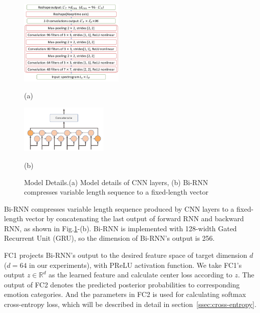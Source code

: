 \documentclass{article}
\begin{document}
\begin{figure}[htb]
	\begin{minipage}[b]{0.04\linewidth}
		\hfill
	\end{minipage}
	\begin{minipage}[b]{0.52\linewidth}
		\centering
		\centerline{\includegraphics[width=5.0cm]{fig2.pdf}}
		\centerline{(a)}\medskip
		
	\end{minipage}
	\hfill
	\begin{minipage}[b]{.42\linewidth}
		\centering
		\centerline{\includegraphics[width=4.2cm, angle=270]{fig3.pdf}}
		\centerline{(b)  }\medskip
	\end{minipage}
	\caption{Model Details.(a) Model details of CNN layers, (b) Bi-RNN compresses variable length sequence to a fixed-length vector}
	\label{fig:model_detail}
\end{figure}

Bi-RNN compresses variable length sequence produced by CNN layers to a fixed-length vector by concatenating the last output of forward RNN and backward RNN, as shown in Fig.\ref{fig:model_detail}-(b). Bi-RNN is implemented with 128-width Gated Recurrent Unit ({GRU})\cite{Cho2014Learning}, so the dimension of Bi-RNN's output is 256.

FC1 projects Bi-RNN's output to the desired feature space of target dimension $d$ ($d=64$ in our experiments), with PReLU\cite{He2015Delving} activation function. We take FC1's output $z \in \mathbb{R}^d$ as the learned feature and calculate center loss according to $z$. The output of FC2 denotes the predicted posterior probabilities to corresponding emotion categories. And the parameters in FC2 is used for calculating softmax cross-entropy loss, which will be described in detail in section~\ref{ssec:cross-entropy}. 
\end{document}
